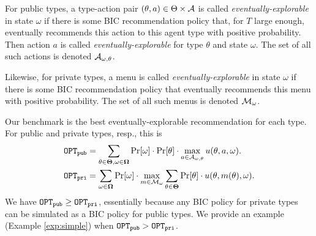 For public types, a type-action pair $(\theta,a)\in \Theta\times \mathcal{A}$ is called \emph{eventually-explorable} in state $\omega$ if there is some BIC recommendation policy that, for $T$ large enough, eventually recommends this action to this agent type with positive probability. Then action $a$ is called \emph{eventually-explorable} for type $\theta$ and state $\omega$. The set of all such actions is denoted $\mathcal{A}_{\omega,\theta}$.

Likewise, for private types, a menu is called \emph{eventually-explorable} in state $\omega$ if there is some BIC recommendation policy that eventually recommends this menu with positive probability. The set of all such menus is denoted $\mathcal{M}_{\omega}$.

Our benchmark is the best eventually-explorable recommendation for each type. For public and private types, resp., this is
\begin{align}
\mathtt{OPT}_{\mathtt{pub}} &= \sum_{\theta \in \bold{\Theta}, \omega\in \bold{\Omega}} \Pr[\omega] \cdot \Pr[\theta] \cdot \max_{a \in \mathcal{A}_{\omega,\theta}} u(\theta, a, \omega).
    \label{eq:bench-public}\\
\mathtt{OPT}_{\mathtt{pri}} &= \sum_{\omega\in \bold{\Omega}} \Pr[\omega] \cdot\max_{m \in \mathcal{M}_{\omega}}\sum_{\theta \in \bold{\Theta}} \Pr[\theta] \cdot  u(\theta, m(\theta), \omega).\label{eq:bench-private}
\end{align}
We have $\mathtt{OPT}_{\mathtt{pub}} \geq \mathtt{OPT}_{\mathtt{pri}}$, essentially because any BIC policy for private types can be simulated as a BIC policy for public types. We provide an example (Example \ref{exp:simple}) when $\mathtt{OPT}_{\mathtt{pub}} > \mathtt{OPT}_{\mathtt{pri}}$.

